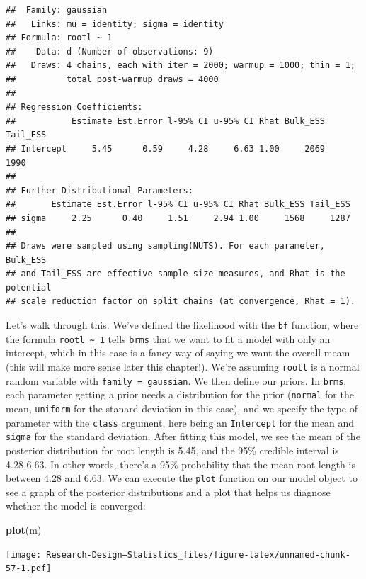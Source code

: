 \documentclass[
]{book}
\newenvironment{Shaded}{\begin{snugshade}}{\end{snugshade}}
\newcommand{\FunctionTok}[1]{\textcolor[rgb]{0.13,0.29,0.53}{\textbf{#1}}}
\newcommand{\NormalTok}[1]{#1}
\begin{document}
\begin{verbatim}
##  Family: gaussian 
##   Links: mu = identity; sigma = identity 
## Formula: rootl ~ 1 
##    Data: d (Number of observations: 9) 
##   Draws: 4 chains, each with iter = 2000; warmup = 1000; thin = 1;
##          total post-warmup draws = 4000
## 
## Regression Coefficients:
##           Estimate Est.Error l-95% CI u-95% CI Rhat Bulk_ESS Tail_ESS
## Intercept     5.45      0.59     4.28     6.63 1.00     2069     1990
## 
## Further Distributional Parameters:
##       Estimate Est.Error l-95% CI u-95% CI Rhat Bulk_ESS Tail_ESS
## sigma     2.25      0.40     1.51     2.94 1.00     1568     1287
## 
## Draws were sampled using sampling(NUTS). For each parameter, Bulk_ESS
## and Tail_ESS are effective sample size measures, and Rhat is the potential
## scale reduction factor on split chains (at convergence, Rhat = 1).
\end{verbatim}

Let's walk through this. We've defined the likelihood with the \texttt{bf} function, where the formula \texttt{rootl\ \textasciitilde{}\ 1} tells \texttt{brms} that we want to fit a model with only an intercept, which in this case is a fancy way of saying we want the overall meam (this will make more sense later this chapter!). We're assuming \texttt{rootl} is a normal random variable with \texttt{family\ =\ gaussian}. We then define our priors. In \texttt{brms}, each parameter getting a prior needs a distribution for the prior (\texttt{normal} for the mean, \texttt{uniform} for the stanard deviation in this case), and we specify the type of parameter with the \texttt{class} argument, here being an \texttt{Intercept} for the mean and \texttt{sigma} for the standard deviation. After fitting this model, we see the mean of the posterior distribution for root length is 5.45, and the 95\% credible interval is 4.28-6.63. In other words, there's a 95\% probability that the mean root length is between 4.28 and 6.63. We can execute the \texttt{plot} function on our model object to see a graph of the posterior distributions and a plot that helps us diagnose whether the model is converged:

\begin{Shaded}
\begin{Highlighting}[]
\FunctionTok{plot}\NormalTok{(m)}
\end{Highlighting}
\end{Shaded}

\texttt{[image: Research-Design---Statistics\_files/figure-latex/unnamed-chunk-57-1.pdf]}
\end{document}
